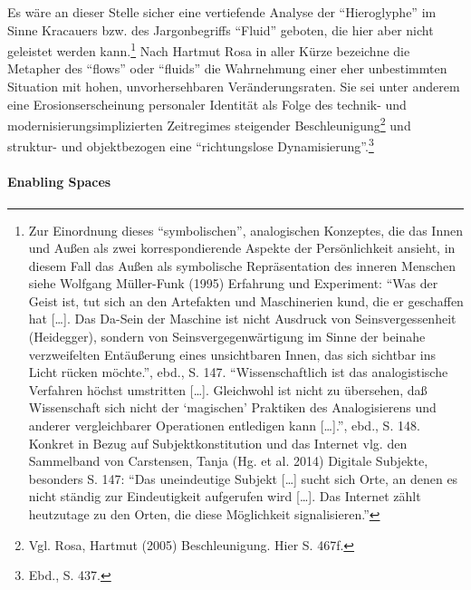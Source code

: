\documentclass[a4paper,
fontsize=11pt,
oneside,
numbers=noperiodatend,
parskip=half-,
bibliography=totoc,
final
]{scrartcl}
\begin{document}
Es wäre an dieser Stelle sicher eine vertiefende Analyse der
\enquote{Hieroglyphe} im Sinne Kracauers bzw. des Jargonbegriffs
\enquote{Fluid} geboten, die hier aber nicht geleistet werden
kann.\footnote{Zur Einordnung dieses \enquote{symbolischen},
  analogischen Konzeptes, die das Innen und Außen als zwei
  korrespondierende Aspekte der Persönlichkeit ansieht, in diesem Fall
  das Außen als symbolische Repräsentation des inneren Menschen siehe
  Wolfgang Müller-Funk (1995) Erfahrung und Experiment: \enquote{Was der
  Geist ist, tut sich an den Artefakten und Maschinerien kund, die er
  geschaffen hat {[}\ldots{}{]}. Das Da-Sein der Maschine ist nicht
  Ausdruck von Seinsvergessenheit (Heidegger), sondern von
  Seinsvergegenwärtigung im Sinne der beinahe verzweifelten Entäußerung
  eines unsichtbaren Innen, das sich sichtbar ins Licht rücken möchte.},
  ebd., S. 147. \enquote{Wissenschaftlich ist das analogistische
  Verfahren höchst umstritten {[}\ldots{}{]}. Gleichwohl ist nicht zu
  übersehen, daß Wissenschaft sich nicht der \enquote{magischen}
  Praktiken des Analogisierens und anderer vergleichbarer Operationen
  entledigen kann {[}\ldots{}{]}.}, ebd., S. 148. Konkret in Bezug auf
  Subjektkonstitution und das Internet vlg. den Sammelband von
  Carstensen, Tanja (Hg. et al. 2014) Digitale Subjekte, besonders S.
  147: \enquote{Das uneindeutige Subjekt {[}\ldots{}{]} sucht sich Orte,
  an denen es nicht ständig zur Eindeutigkeit aufgerufen wird
  {[}\ldots{}{]}. Das Internet zählt heutzutage zu den Orten, die diese
  Möglichkeit signalisieren.}} Nach Hartmut Rosa in aller Kürze
bezeichne die Metapher des \enquote{flows} oder \enquote{fluids} die
Wahrnehmung einer eher unbestimmten Situation mit hohen,
unvorhersehbaren Veränderungsraten. Sie sei unter anderem eine
Erosionserscheinung personaler Identität als Folge des technik- und
modernisierungsimplizierten Zeitregimes steigender
Beschleunigung\footnote{Vgl. Rosa, Hartmut (2005) Beschleunigung. Hier
  S. 467f.} und struktur- und objektbezogen eine \enquote{richtungslose
Dynamisierung}.\footnote{Ebd., S. 437.}

\paragraph{Enabling Spaces}\label{enabling-spaces}
\end{document}
